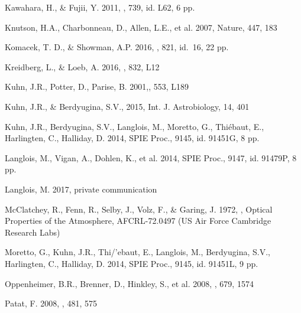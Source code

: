 \documentclass{emulateapj}
\begin{document}
\begin{thebibliography}{}
Kawahara, H., \& Fujii, Y.  
   2011, \apjl, 739, id. L62, 6 pp.
   
Knutson, H.A., Charbonneau, D., Allen, L.E., et al.
   2007, Nature, 447, 183
	
Komacek, T. D., \& Showman, A.P.
   2016, \apj, 821, id.\ 16, 22 pp.
   
Kreidberg, L., \& Loeb, A.
   2016, \apjl, 832, L12

Kuhn, J.R., Potter, D., Parise, B.
   2001,\apjl, 553, L189
   
Kuhn, J.R., \& Berdyugina, S.V.,
   2015, Int. J. Astrobiology, 14, 401
   
Kuhn, J.R., Berdyugina, S.V., Langlois, M., Moretto, G., Thi\'ebaut, E., Harlingten, C., Halliday, D.
   2014, SPIE Proc., 9145, id. 91451G, 8 pp. 
   
Langlois, M., Vigan, A., Dohlen, K., et al.
   2014, SPIE Proc., 9147, id. 91479P, 8 pp. 

Langlois, M.
   2017, private communication
   

McClatchey, R., Fenn, R., Selby, J., Volz, F., \& Garing, J.
   1972, \aap, Optical Properties of the Atmosphere, AFCRL-72.0497 
   (US Air Force Cambridge Research Labs)
   
Moretto, G., Kuhn, J.R., Thi/'ebaut, E., Langlois, M., Berdyugina, S.V., Harlingten, C., Halliday, D.
   2014, SPIE Proc., 9145, id. 91451L, 9 pp. 

Oppenheimer, B.R., Brenner, D., Hinkley, S., et al.
   2008, \apj, 679, 1574
   
Patat, F. 
   2008, \aap, 481, 575
   


\end{thebibliography}
\end{document}
